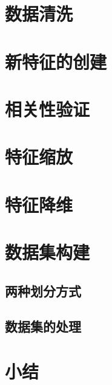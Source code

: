 \section{数据清洗}
\section{新特征的创建}
\section{相关性验证}
\section{特征缩放}
\section{特征降维}
\section{数据集构建}
\subsection{两种划分方式}
\subsection{数据集的处理}
\section{小结}